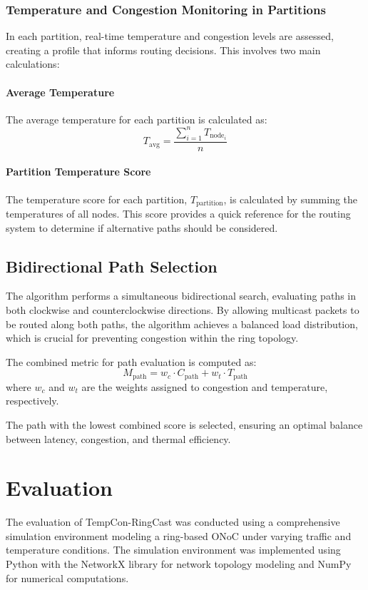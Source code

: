 \documentclass[conference]{IEEEtran}
\begin{document}
\subsubsection{Temperature and Congestion Monitoring in Partitions}
In each partition, real-time temperature and congestion levels are assessed, creating a profile that informs routing decisions. This involves two main calculations:

\paragraph{Average Temperature}
The average temperature for each partition is calculated as:
\begin{equation}
T_{\text{avg}} = \frac{\sum_{i=1}^{n} T_{\text{node}_i}}{n}
\end{equation}

\paragraph{Partition Temperature Score}
The temperature score for each partition, $T_{\text{partition}}$, is calculated by summing the temperatures of all nodes. This score provides a quick reference for the routing system to determine if alternative paths should be considered.

\subsection{Bidirectional Path Selection}
The algorithm performs a simultaneous bidirectional search, evaluating paths in both clockwise and counterclockwise directions. By allowing multicast packets to be routed along both paths, the algorithm achieves a balanced load distribution, which is crucial for preventing congestion within the ring topology.

The combined metric for path evaluation is computed as:
\begin{equation}
M_{\text{path}} = w_c \cdot C_{\text{path}} + w_t \cdot T_{\text{path}}
\end{equation}
where $w_c$ and $w_t$ are the weights assigned to congestion and temperature, respectively.

The path with the lowest combined score is selected, ensuring an optimal balance between latency, congestion, and thermal efficiency.

\section{Evaluation}
The evaluation of TempCon-RingCast was conducted using a comprehensive simulation environment modeling a ring-based ONoC under varying traffic and temperature conditions. The simulation environment was implemented using Python with the NetworkX library for network topology modeling and NumPy for numerical computations.
\end{document}
